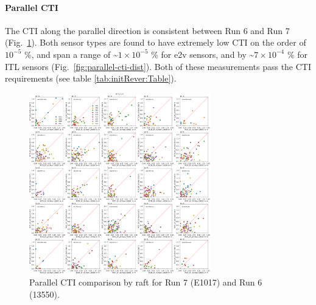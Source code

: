 \clearpage
\paragraph{Parallel CTI}\label{parallel-cti}

The CTI along the parallel direction is consistent between Run 6 and
Run 7 (Fig.~\ref{fig:parallel-cti}). Both sensor types are found to have extremely low CTI on the order of $10^{-5}$ \%,
and span a range of \textasciitilde$1 \times 10^{-5}$ \% for e2v sensors, and
by \textasciitilde$7 \times 10^{-4}$ \% for ITL sensors (Fig.~\ref{fig:parallel-cti-dist}). Both of these measurements pass the CTI requirements (see table \ref{tab:initRever:Table}).

\begin{figure}[ht]
\begin{centering}
\includegraphics[width=0.7\textwidth]{figures/baselineCharacterization/13550_E1071_PCTI_EF_43_inset.png}
\caption{Parallel CTI comparison by raft for Run 7 (E1017) and Run 6 (13550).}
\label{fig:parallel-cti}
\end{centering}
\end{figure}

